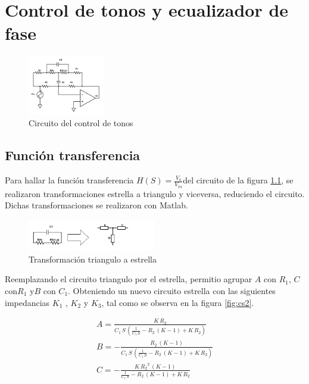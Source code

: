 \documentclass[../../tc_tp3_main.tex]{subfiles}
\begin{document}
\chapter{Control de tonos y ecualizador de fase}

\begin{figure}[H]
\centering
\includegraphics[width=0.3\textwidth]{imagenes/circuitoControlTonos.png}
\caption{Circuito del control de tonos} \label{fig:cct}
\end{figure}




\section{Función transferencia}

Para hallar la función transferencia $H(S)=\frac{V_{o}}{V_{in}} $del circuito de la figura \ref{fig:cct}, se realizaron transformaciones estrella a triangulo y viceversa, reduciendo el circuito. Dichas transformaciones se realizaron con Matlab.



\begin{figure}[H]
\centering
\includegraphics[width=0.5\textwidth]{imagenes/simpl1.png}
\caption{Transformación triangulo a estrella} \label{fig:cs1}
\end{figure}

Reemplazando el circuito triangulo por el estrella, permitio agrupar $A$ con $R_1$, $C$ con$ R_1$ y$ B$ con $C_1$. Obteniendo un nuevo circuito estrella con las siguientes impedancias $ K_1$ , $K_2$ y  $K_3$, tal como se observa en la figura \ref{fig:cs2}.

\begin{gather}
   A=\frac{K\, R_{2}}{C_{1}\, S\, \left(\frac{1}{C_{1}\, S} - R_{2}\, \left(K - 1\right) + K\, R_{2}\right)} \\
B=-\frac{R_{2}\, \left(K - 1\right)}{C_{1}\, S\, \left(\frac{1}{C_{1}\, S} - R_{2}\, \left(K - 1\right) + K\, R_{2}\right)}\\
C=-\frac{K\, {R_{2}}^2\, \left(K - 1\right)}{\frac{1}{C_{1}\, S} - R_{2}\, \left(K - 1\right) + K\, R_{2}}
\end{gather}
\end{document}
